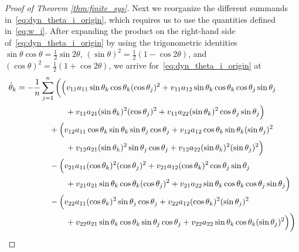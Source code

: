 \documentclass[10pt]{article}
\theoremstyle{definition}
\theoremstyle{definition}
\numberwithin{equation}{section}
\begin{document}
\begin{proof}[Proof of Theorem \ref{thm:finite_sys}]
Next we reorganize the different summands in~\eqref{eq:dyn_theta_i_origin},
which requires us to use the quantities defined in~\eqref{eq:w_i}.   After expanding the product on the right-hand side of~\eqref{eq:dyn_theta_i_origin} by using the trigonometric identities
$\sin \theta \cos \theta = \frac{1}{2}\sin 2\theta$, $(\sin \theta)^2 = \frac{1}{2}(1-\cos 2\theta)$, and $(\cos \theta)^2 = \frac{1}{2}(1+\cos 2\theta)$,
we arrive for~\eqref{eq:dyn_theta_i_origin} at
    \begin{align}
        \label{eq:dyn_theta_i_origin_expanded}
        \Dot{\theta}_k
        &=-\frac{1}{n} \sum_{j=1}^n \bigg(\Big(v_{11}a_{11} \sin \theta_k \cos \theta_k (\cos\theta_j)^2 + v_{11}a_{12} \sin \theta_k \cos \theta_k\cos \theta_j \sin \theta_j \notag\\
        &\qquad \qquad \qquad + v_{11}a_{21} (\sin \theta_k)^2 (\cos \theta_j)^2 + v_{11}a_{22} (\sin \theta_k)^2 \cos \theta_j \sin \theta_j \Big) \notag\\
        &\qquad \qquad + \Big(v_{12}a_{11} \cos \theta_k\sin \theta_k \sin \theta_j \cos\theta_j + v_{12}a_{12} \cos \theta_k \sin \theta_k (\sin \theta_j)^2 \notag \\
        &\qquad \qquad \qquad + v_{12}a_{21} (\sin \theta_k)^2 \sin \theta_j\cos \theta_j + v_{12}a_{22} (\sin \theta_k)^2 (\sin \theta_j)^2\Big) \notag \\
        &\qquad \qquad - \Big(v_{21}a_{11} (\cos \theta_k)^2 (\cos \theta_j)^2 + v_{21}a_{12} (\cos \theta_k)^2 \cos \theta_j\sin \theta_j \notag\\
        &\qquad \qquad \qquad + v_{21}a_{21} \sin \theta_k\cos \theta_k (\cos \theta_j)^2 + v_{21}a_{22} \sin \theta_k\cos \theta_k \cos \theta_j \sin \theta_j\Big) \notag\\
        &\qquad \qquad - \Big(v_{22}a_{11} (\cos \theta_k)^2 \sin \theta_j \cos\theta_j  + v_{22}a_{12} (\cos \theta_k)^2 (\sin \theta_j)^2 \notag \\
        &\qquad \qquad \qquad + v_{22}a_{21} \sin \theta_k\cos \theta_k \sin \theta_j\cos \theta_j + v_{22}a_{22} \sin \theta_k \cos \theta_k (\sin\theta_j)^2\Big) \bigg) \notag \\

\end{align}
\end{proof}
\end{document}
